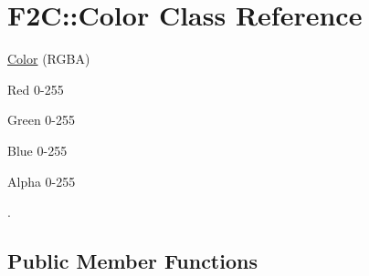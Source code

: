 \hypertarget{class_f2_c_1_1_color}{
\section{F2C::Color Class Reference}
\label{class_f2_c_1_1_color}
}


\hyperlink{class_f2_c_1_1_color}{Color} (RGBA) \par
 Red 0-\/255 \par
 Green 0-\/255 \par
 Blue 0-\/255 \par
 Alpha 0-\/255 \par
.  


\subsection*{Public Member Functions}
